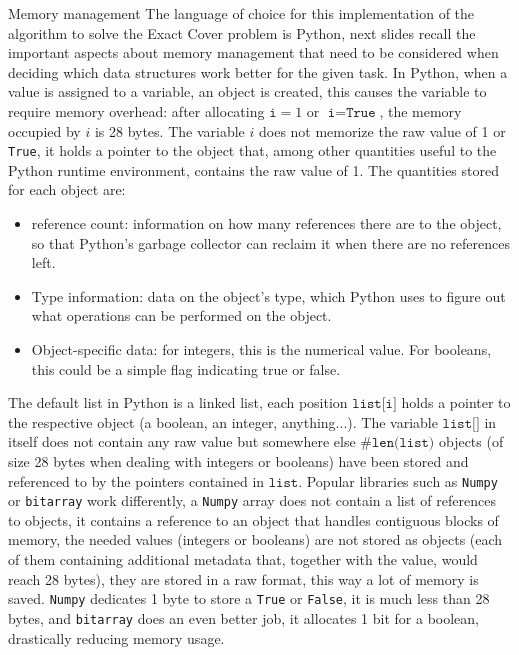 \documentclass{beamer}
\begin{document}

\begin{frame}{Memory management}
    \small
    The language of choice for this implementation of the algorithm
    to solve the Exact Cover problem is Python, next slides recall
    the important aspects about memory management that need to be 
    considered when deciding which data structures work better for the
    given task.
    In Python, when a value is assigned to a variable, an object is created, this
    causes the variable to require memory overhead: after
    allocating $\texttt{i} = 1$ or $\texttt{i} = \texttt{True}$, the memory occupied by
    $i$ is 28 bytes.
    The variable $i$ does not memorize the raw value of 1 or \texttt{True}, it holds
    a pointer to the object that, among other quantities useful to the Python
    runtime environment, contains the raw value of 1. The quantities
    stored for each object are:
    \begin{itemize}
        \item reference count: information on how many references there 
        are to the object, so that Python's garbage collector can reclaim it 
        when there are no references left. 
        \item Type information: data on the object's type, which Python 
        uses to figure out what operations can be performed on the object.
        \item Object-specific data: for integers, this is the numerical value. 
        For booleans, this could be a simple flag indicating true or false.
    \end{itemize}
\end{frame}

\begin{frame}{}
    The default list in Python is a linked list, each position $\texttt{list[i]}$ holds a pointer to the
    respective object
    (a boolean, an integer, anything...).
    The variable $\texttt{list[]}$ in itself does not contain any raw value but somewhere else
    $\#\texttt{len(list)}$ objects (of size 28 bytes when dealing with integers or booleans)
    have been stored and referenced to by the pointers contained in $\texttt{list}$.
    Popular libraries such as \texttt{Numpy} or \texttt{bitarray} work differently,
    a \texttt{Numpy} array does not contain a list of references to objects, it contains
    a reference to an object that handles contiguous blocks of memory, the needed
    values (integers or booleans) are not stored as objects (each of them containing additional metadata
    that, together with the value, would reach 28 bytes), they are stored in a raw format,
    this way a lot of memory is saved.
    \texttt{Numpy} dedicates 1 byte to store a \texttt{True} or \texttt{False}, it is much less
    than 28 bytes, and \texttt{bitarray} does an even better job, it allocates 1 bit for a boolean,
    drastically reducing memory usage.
\end{frame}
\end{document}
